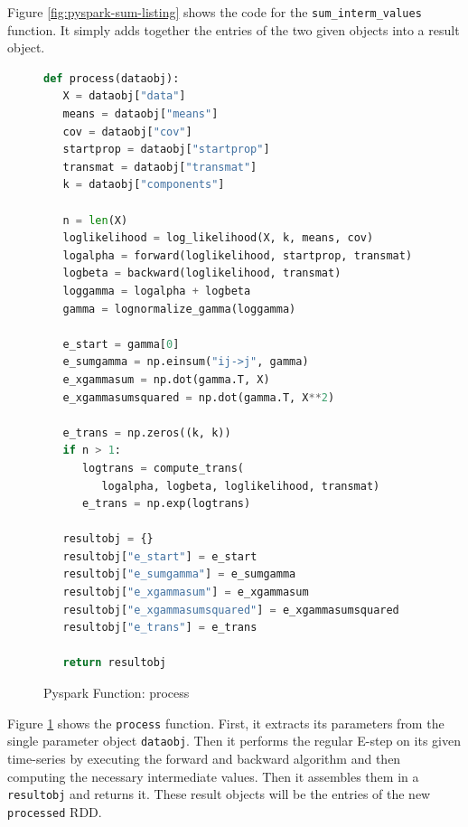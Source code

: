 Figure \ref{fig:pyspark-sum-listing} shows the code for the \texttt{sum\_interm\_values} function. It simply adds together the entries of the two given objects into a result object. 

\begin{figure}
\begin{singlespace}
\begin{lstlisting}[language=Python]
def process(dataobj):
   X = dataobj["data"]
   means = dataobj["means"]
   cov = dataobj["cov"]
   startprop = dataobj["startprop"]
   transmat = dataobj["transmat"]
   k = dataobj["components"]

   n = len(X)
   loglikelihood = log_likelihood(X, k, means, cov)
   logalpha = forward(loglikelihood, startprop, transmat)
   logbeta = backward(loglikelihood, transmat)
   loggamma = logalpha + logbeta
   gamma = lognormalize_gamma(loggamma)

   e_start = gamma[0]
   e_sumgamma = np.einsum("ij->j", gamma)
   e_xgammasum = np.dot(gamma.T, X)
   e_xgammasumsquared = np.dot(gamma.T, X**2)

   e_trans = np.zeros((k, k))
   if n > 1:
      logtrans = compute_trans(
         logalpha, logbeta, loglikelihood, transmat)
      e_trans = np.exp(logtrans)

   resultobj = {}
   resultobj["e_start"] = e_start
   resultobj["e_sumgamma"] = e_sumgamma
   resultobj["e_xgammasum"] = e_xgammasum
   resultobj["e_xgammasumsquared"] = e_xgammasumsquared
   resultobj["e_trans"] = e_trans

   return resultobj
\end{lstlisting}
\end{singlespace}
\caption{Pyspark Function: process}    
\label{fig:pyspark-process-listing}
\end{figure}

Figure \ref{fig:pyspark-process-listing} shows the \texttt{process} function. First, it extracts its parameters from the single parameter object \texttt{dataobj}. Then it performs the regular E-step on its given time-series by executing the forward and backward algorithm and then computing the necessary intermediate values. Then it assembles them in a \texttt{resultobj} and returns it. These result objects will be the entries of the new \texttt{processed} RDD.